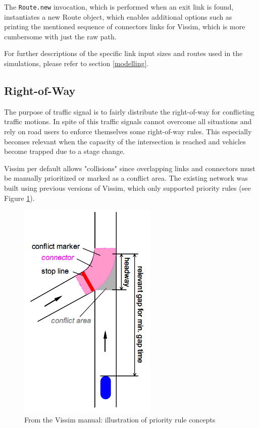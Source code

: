 The \verb|Route.new| invocation, which is performed when an exit link is found, instantiates a new Route object, which enables additional options such as printing the mentioned sequence of connectors links for Vissim, which is more cumbersome with just the raw path.

For further descriptions of the specific link input sizes and routes used in the simulations, please refer to section \ref{modelling}.

\subsection{Right-of-Way}
The purpose of traffic signal is to fairly distribute the right-of-way for conflicting traffic motions.  In spite of this traffic signals cannot overcome all situations and rely on road users to enforce themselves some right-of-way rules. This especially becomes relevant when the capacity of the intersection is reached and vehicles become trapped due to a stage change.

Vissim per default allows "collisions" since overlapping links and connectors must be manually prioritized or marked as a conflict area. The existing network was built using previous versions of Vissim, which only supported priority rules (see Figure \ref{fig:priority_rules}). 

\begin{figure}[!ht]
\begin{center}
\includegraphics[scale=0.5]{priority_rules.png} 
\end{center}
\caption{From the Vissim manual: illustration of priority rule concepts}
\label{fig:priority_rules}
\end{figure}

